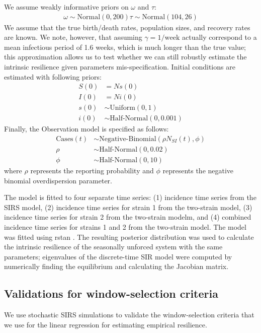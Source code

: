 \documentclass[12pt]{article}
\begin{document}
We assume weakly informative priors on $\omega$ and $\tau$:
\begin{align}
\omega \sim \mathrm{Normal}(0, 200)
\tau \sim \mathrm{Normal}(104, 26)
\end{align}
We assume that the true birth/death rates, population sizes, and recovery rates are known.
We note, however, that assuming $\gamma=1/\mathrm{week}$ actually correspond to a mean infectious period of 1.6 weeks, which is much longer than the true value; this approximation allows us to test whether we can still robustly estimate the intrinsic resilience given parameters mis-specification.
Initial conditions are estimated with following priors:
\begin{align}
S(0) &= N s(0)\\
I(0) &= N i(0)\\
s(0) &\sim \textrm{Uniform}(0, 1)\\
i(0) &\sim \textrm{Half-Normal}(0, 0.001)
\end{align}
Finally, the Observation model is specified as follows:
\begin{align}
\textrm{Cases}(t) &\sim \textrm{Negative-Binomial}(\rho N_{SI}(t), \phi)\\
\rho &\sim \textrm{Half-Normal}(0, 0.02)\\
\phi &\sim \textrm{Half-Normal}(0, 10)
\end{align}
where $\rho$ represents the reporting probability and $\phi$ represents the negative binomial overdispersion parameter.

The model is fitted to four separate time series: (1) incidence time series from the SIRS model, (2) incidence time series for strain 1 from the two-strain model, (3) incidence time series for strain 2 from the two-strain modelm, and (4) combined incidence time series for strains 1 and 2 from the two-strain model.
The model was fitted using rstan \citep{carpenter2017stan,rstan}.
The resulting posterior distribution was used to calculate the intrinsic resilience of the seasonally unforced system with the same parameters;
eigenvalues of the discrete-time SIR model were computed by numerically finding the equilibrium and calculating the Jacobian matrix.

\subsection*{Validations for window-selection criteria}

We use stochastic SIRS simulations to validate the window-selection criteria that we use for the linear regression for estimating empirical resilience.
\end{document}
